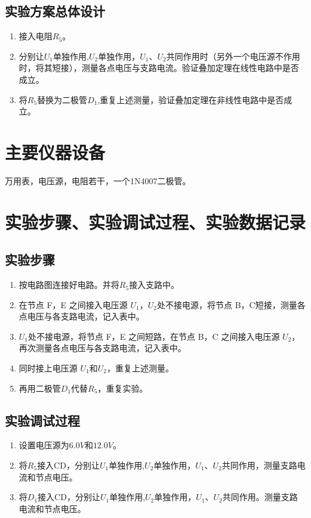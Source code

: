 \documentclass{../source/Experiment}
\begin{document}
        \subsection{实验方案总体设计}
            \begin{enumerate}
                \item 接入电阻$R_5$。
                \item 分别让$U_1$单独作用,$U_2$单独作用，$U_1$、$U_2$共同作用时（另外一个电压源不作用时，将其短接），测量各点电压与支路电流。验证叠加定理在线性电路中是否成立。
                \item 将$R_5$替换为二极管$D_1$,重复上述测量，验证叠加定理在非线性电路中是否成立。
            \end{enumerate}
    \section{主要仪器设备}
            万用表，电压源，电阻若干，一个1N4007二极管。
    \section{实验步骤、实验调试过程、实验数据记录}
        \subsection{实验步骤}
            \begin{enumerate}
                \item 按电路图连接好电路。并将$R_5$接入支路中。
                \item 在节点 F，E 之间接入电压源 $U_1$，$U_2$处不接电源，将节点 B，C短接，测量各点电压与各支路电流，记入表中。
                \item $U_1$处不接电源，将节点 F，E 之间短路，在节点 B，C 之间接入电压源 $U_2$，再次测量各点电压与各支路电流，记入表中。
                \item 同时接上电压源 $U_1$和$U_2$，重复上述测量。
                \item 再用二极管$D_1$代替$R_5$，重复实验。 
            \end{enumerate}
        \subsection{实验调试过程}
            \begin{enumerate}
                \item 设置电压源为$6.0V$和$12.0V$。
                \item 将$R_5$接入CD，分别让$U_1$单独作用,$U_2$单独作用，$U_1$、$U_2$共同作用，测量支路电流和节点电压。
                \item 将$D_1$接入CD，分别让$U_1$单独作用,$U_2$单独作用，$U_1$、$U_2$共同作用。测量支路电流和节点电压。
            \end{enumerate}
\end{document}
